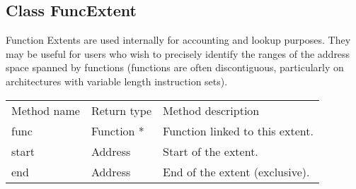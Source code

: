\subsection{Class FuncExtent}


Function Extents are used internally for accounting and lookup purposes. They may be useful for users who wish to precisely identify the ranges of the address space spanned by functions (functions are often discontiguous, particularly on architectures with variable length instruction sets).


\begin{tabular}{p{1.25in}p{1.125in}p{3.125in}}
	Method name & Return type & Method description \\
	func & Function * & Function linked to this extent. \\
	start & Address & Start of the extent. \\
	end & Address & End of the extent (exclusive). \\
\end{tabular}

